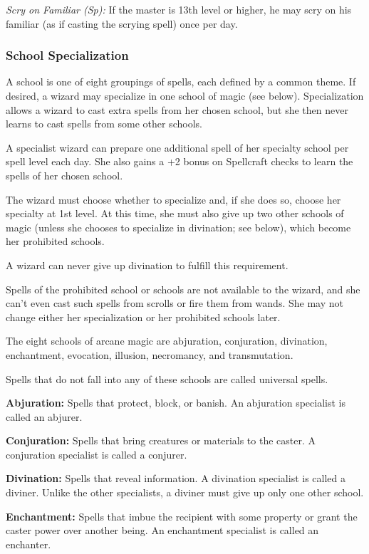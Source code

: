 \textit{Scry on Familiar (Sp):} If the master is 13th level or higher, he may scry on his familiar (as if casting the scrying spell) once per day.

\subsubsection{School Specialization}
A school is one of eight groupings of spells, each defined by a common theme. If desired, a wizard may specialize in one school of magic (see below). Specialization allows a wizard to cast extra spells from her chosen school, but she then never learns to cast spells from some other schools.

A specialist wizard can prepare one additional spell of her specialty school per spell level each day. She also gains a +2 bonus on Spellcraft checks to learn the spells of her chosen school.

The wizard must choose whether to specialize and, if she does so, choose her specialty at 1st level. At this time, she must also give up two other schools of magic (unless she chooses to specialize in divination; see below), which become her prohibited schools.

A wizard can never give up divination to fulfill this requirement.

Spells of the prohibited school or schools are not available to the wizard, and she can't even cast such spells from scrolls or fire them from wands. She may not change either her specialization or her prohibited schools later.

The eight schools of arcane magic are abjuration, conjuration, divination, enchantment, evocation, illusion, necromancy, and transmutation.

Spells that do not fall into any of these schools are called universal spells.

\textbf{Abjuration:} Spells that protect, block, or banish. An abjuration specialist is called an abjurer.

\textbf{Conjuration:} Spells that bring creatures or materials to the caster. A conjuration specialist is called a conjurer.

\textbf{Divination:} Spells that reveal information. A divination specialist is called a diviner. Unlike the other specialists, a diviner must give up only one other school.

\textbf{Enchantment:} Spells that imbue the recipient with some property or grant the caster power over another being. An enchantment specialist is called an enchanter.

